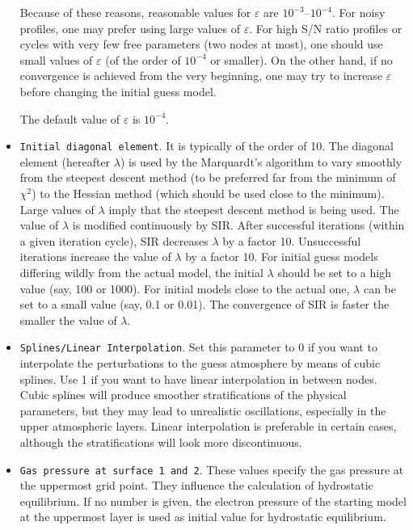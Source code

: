 \documentclass[11pt]{report}
\begin{document}
\begin{itemize}
Because of these reasons, reasonable values for $\varepsilon$ are
$10^{-3}$--$10^{-4}$.  For noisy profiles, one may prefer using large
values of $\varepsilon$. For high S/N ratio profiles or cycles with
very few free parameters (two nodes at most), one should use small
values of $\varepsilon$ (of the order of $10^{-4}$ or smaller). On the
other hand, if no convergence is achieved from the very beginning, one 
may try to increase $\varepsilon$ before changing the initial guess model. 

The default value of $\varepsilon$ is $10^{-4}$. 
 
\item {\tt Initial diagonal element}. It is typically of the order of
10. The diagonal element (hereafter $\lambda$) is used by the
Marquardt's algorithm to vary smoothly from the steepest descent method
(to be preferred far from the minimum of $\chi^2$) to the Hessian
method (which should be used close to the minimum). Large values of $\lambda$ 
imply that the steepest descent method is being used. The value of $\lambda$ 
is modified continuously by SIR. After successful iterations (within a given 
iteration cycle), SIR decreases $\lambda$ by a factor 10. Unsuccessful 
iterations increase the value of $\lambda$ by a factor 10. For initial
guess models differing wildly from the actual model, the initial $\lambda$
should be set to a high value (say, 100 or 1000). For initial models close
to the actual one, $\lambda$ can be set to a small value (say, 0.1 or 0.01). 
The convergence of SIR is faster the smaller the value of $\lambda$. 

\item {\tt Splines/Linear Interpolation}. Set this parameter to 0 if you 
want to interpolate the perturbations to the guess atmosphere by means
of cubic splines. Use 1 if you want to have linear interpolation in 
between nodes. Cubic splines will produce smoother stratifications of
the physical parameters, but they may lead to unrealistic oscillations,
especially in the upper atmospheric layers. Linear interpolation is
preferable in certain cases, although the stratifications will look 
more discontinuous.

\item {\tt Gas pressure at surface 1 and 2}. These values specify 
the gas pressure at the uppermost grid point. They influence 
the calculation of hydrostatic equilibrium. If no number is given, 
the electron pressure of the starting model at the uppermost layer 
is used as initial value for hydrostatic equilibrium.

\end{itemize}  
\end{document}
